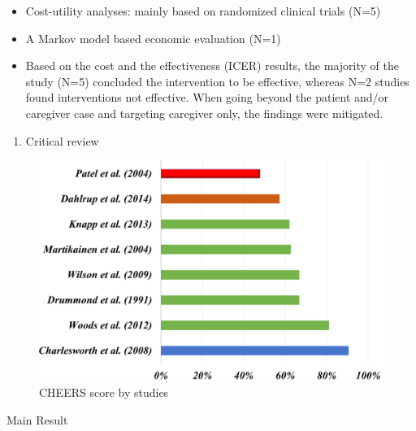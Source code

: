 \documentclass[final]{beamer}
\newlength{\onecolwid}
\begin{document}
\begin{frame}[t]
\begin{columns}[t]
\begin{column}{\onecolwid}
\begin{block}{}
\begin{itemize}
     \item \justifying Cost-utility analyses: mainly based on randomized clinical trials (N=5)
    \item A Markov model based economic evaluation (N=1)
    \item Based on the cost and the effectiveness (ICER) results, the majority of the study (N=5) concluded the intervention to be effective, whereas N=2 studies  found interventions not effective. When going beyond the patient and/or caregiver case and targeting caregiver only, the findings were mitigated.
\end{itemize}
\vspace{-1.0cm}
\begin{enumerate}
    \item Critical review
\end{enumerate}
\vspace{-1.0cm}
\begin{figure}
\includegraphics[width=1.0\linewidth]{stat_desc2.png}
\vspace{-0.5cm}
\caption{CHEERS score by studies}
\end{figure}

\end{block}


\vspace{-1.0cm}
\begin{alertblock}{Main Result}


\end{alertblock}
\end{column}
\end{columns}
\end{frame}
\end{document}

